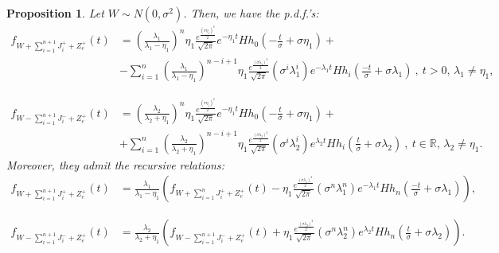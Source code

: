 \documentclass[11pt]{article}
\newtheorem{proposition}[theorem]{Proposition}
\numberwithin{equation}{section}
\numberwithin{theorem}{section}
\def\R{\mathbb{R}}
\begin{document}
\begin{proposition}
\label{prop:densities}Let $W\sim N\left(0,\sigma^{2}\right)$. Then, we have the p.d.f.'s:
\begin{align}
f_{W+\sum_{i=1}^{n+1}J_{i}^{+}+Z_{e}^{+}}\left(t\right) & =  \left(\frac{\lambda_{1}}{\lambda_{1}-\eta_{1}}\right)^{n}\eta_{1}\frac{e^{\frac{\left(\sigma\eta_{1}\right)^{2}}{2}}}{\sqrt{2\pi}}e^{-\eta_{1}t}Hh_{0}\left(-\frac{t}{\sigma}+\sigma\eta_{1}\right)+\label{eq:fn_++}\\
 &  -\sum_{i=1}^{n}\left(\frac{\lambda_{1}}{\lambda_{1}-\eta_{1}}\right)^{n-i+1}\eta_{1}\frac{e^{\frac{\left(\sigma\lambda_{1}\right)^{2}}{2}}}{\sqrt{2\pi}}\left(\sigma^{i}\lambda_{1}^{i}\right)e^{-\lambda_{1}t}Hh_{i}\left(\frac{-t}{\sigma}+\sigma\lambda_{1}\right)\ ,\ t>0,\, \lambda_{1}\neq\eta_{1},\nonumber 
\end{align}
 
\begin{align}
f_{W-\sum_{i=1}^{n+1}J_{i}^{-}+Z_{e}^{+}}\left(t\right) & =  \left(\frac{\lambda_{2}}{\lambda_{2}+\eta_{1}}\right)^{n}\eta_{1}\frac{e^{\frac{\left(\sigma\eta_{1}\right)^{2}}{2}}}{\sqrt{2\pi}}e^{-\eta_{1}t}Hh_{0}\left(-\frac{t}{\sigma}+\sigma\eta_{1}\right)+\label{eq:fn_-+}\\
 &   +\sum_{i=1}^{n}\left(\frac{\lambda_{2}}{\lambda_{2}+\eta_{1}}\right)^{n-i+1}\eta_{1}\frac{e^{\frac{\left(\sigma\lambda_{2}\right)^{2}}{2}}}{\sqrt{2\pi}}\left(\sigma^{i}\lambda_{2}^{i}\right)e^{\lambda_{2}t}Hh_{i}\left(\frac{t}{\sigma}+\sigma\lambda_{2}\right)\ ,\ t\in \R, \, \lambda_{2}\neq\eta_{1}.\nonumber 
\end{align}
Moreover,   they  admit the  recursive
relations: 
\begin{align}
f_{W+\sum_{i=1}^{n+1}J_{i}^{+}+Z_{e}^{+}}\left(t\right) & =\frac{\lambda_{1}}{\lambda_{1}-\eta_{1}}\left(f_{W+\sum_{i=1}^{n}J_{i}^{+}+Z_{e}^{+}}\left(t\right)-\eta_{1}\frac{e^{\frac{\left(\sigma\lambda_{1}\right)^{2}}{2}}}{\sqrt{2\pi}}\left(\sigma^{n}\lambda_{1}^{n}\right)e^{-\lambda_{1}t}Hh_{n}\left(\frac{-t}{\sigma}+\sigma\lambda_{1}\right)\right),\label{eq:fnrec_++}
\end{align}
 
\begin{align}
f_{W-\sum_{i=1}^{n+1}J_{i}^{-}+Z_{e}^{+}}\left(t\right) & =\frac{\lambda_{2}}{\lambda_{2}+\eta_{1}}\left(f_{W-\sum_{i=1}^{n+1}J_{i}^{-}+Z_{e}^{+}}\left(t\right)+\eta_{1}\frac{e^{\frac{\left(\sigma\lambda_{2}\right)^{2}}{2}}}{\sqrt{2\pi}}\left(\sigma^{n}\lambda_{2}^{n}\right)e^{\lambda_{2}t}Hh_{n}\left(\frac{t}{\sigma}+\sigma\lambda_{2}\right)\right).\label{eq:fnrec_-+}
\end{align}
 \end{proposition}
\end{document}
